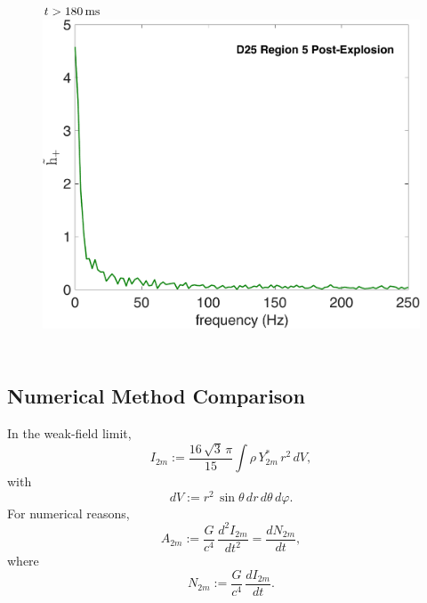 \documentclass[aspectratio=169]{beamer}
\begin{document}
\begin{frame}
\begin{columns}[c]
    \begin{figure}
      $t>180\,\mathrm{ms}$
      \includegraphics[width=1.0\textwidth]{Figures/D25_PostE.pdf}
    \end{figure}

  \end{columns}

\end{frame}

\subsection{Numerical Method Comparison}

\begin{frame}

  In the weak-field limit,
  \begin{equation*}
    I_{2m}:=\frac{16\,\sqrt{3}\,\pi}{15}\int\rho\,Y^{*}_{2m}\,r^{2}\,dV,
  \end{equation*}
  with
  \begin{equation*}
  dV:=r^{2}\,\sin\theta\,dr\,d\theta\,d\varphi.
  \end{equation*}
  For numerical reasons,
  \begin{equation*}
  A_{2m}:=\frac{G}{c^{4}}\,\frac{d^{2}I_{2m}}{dt^{2}}=\frac{dN_{2m}}{dt},
  \end{equation*}
  where
  \begin{equation*}
  N_{2m}:=\frac{G}{c^{4}}\,\frac{dI_{2m}}{dt}.
  \end{equation*}

\end{frame}
\end{document}
